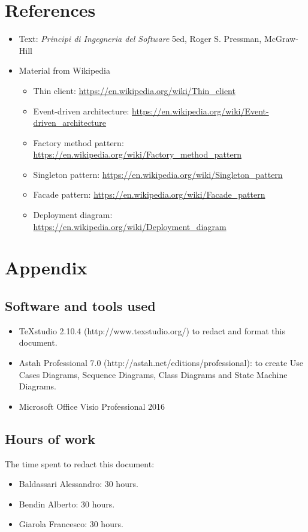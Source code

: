 \documentclass[a4paper,11pt]{report} %
\begin{document}
	\section{References}
	\begin{itemize}
		\item Text: \textit{Principi di Ingegneria del Software} 5ed, Roger S. Pressman, McGraw-Hill
		\item Material from Wikipedia
		\begin{itemize}
			\item Thin client: \href{https://en.wikipedia.org/wiki/Thin_client}{https://en.wikipedia.org/wiki/Thin\_client}
			\item Event-driven architecture: \href{https://en.wikipedia.org/wiki/Event-driven_architecture}{https://en.wikipedia.org/wiki/Event-driven\_architecture}
			\item Factory method pattern: \href{https://en.wikipedia.org/wiki/Factory_method_pattern}{https://en.wikipedia.org/wiki/Factory\_method\_pattern}
			\item Singleton pattern: \href{https://en.wikipedia.org/wiki/Singleton_pattern}{https://en.wikipedia.org/wiki/Singleton\_pattern}
			\item Facade pattern: \href{https://en.wikipedia.org/wiki/Facade_pattern}{https://en.wikipedia.org/wiki/Facade\_pattern}
			\item Deployment diagram:
			\href{https://en.wikipedia.org/wiki/Deployment_diagram}{https://en.wikipedia.org/wiki/Deployment\_diagram}
		\end{itemize}
	\end{itemize}
	
	
	\section{Appendix}
	
	\subsection{Software and tools used}
	\begin{itemize}
		\item TeXstudio 2.10.4 (http://www.texstudio.org/) to redact and format this document.
		\item Astah Professional 7.0 (http://astah.net/editions/professional): to create Use
		Cases Diagrams, Sequence Diagrams, Class Diagrams and State Machine	Diagrams.
		\item Microsoft Office Visio Professional 2016
	\end{itemize}
	
	\subsection{Hours of work} The time spent to redact this document:
	\begin{itemize}
		\item Baldassari Alessandro: 30 hours.
		\item Bendin Alberto: 30 hours.
		\item Giarola Francesco: 30 hours.
	\end{itemize}
\end{document}
